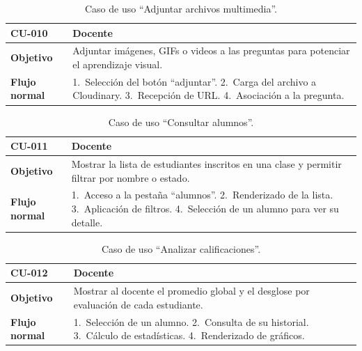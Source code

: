 \begin{table}[H]
\centering
\caption{Caso de uso ``Adjuntar archivos multimedia''.}
\label{tab:cu_multimedia}
\begin{small}
\begin{tabularx}{\textwidth}{|L{3cm}|X|}
\hline
{}
 CU-010 &  Docente\\
\hline
\textbf{Objetivo} & Adjuntar imágenes, GIFs o videos a las preguntas para potenciar el aprendizaje visual.\\
\hline
\textbf{Flujo normal} & 1.~Selección del botón ``adjuntar''. 2.~Carga del archivo a Cloudinary. 3.~Recepción de URL. 4.~Asociación a la pregunta.\\
\hline
\end{tabularx}
\end{small}
\fuenteautor
\end{table}

\begin{table}[H]
\centering
\caption{Caso de uso ``Consultar alumnos''.}
\label{tab:cu_alumnos}
\begin{small}
\begin{tabularx}{\textwidth}{|L{3cm}|X|}
\hline
{}
 CU-011 &  Docente\\
\hline
\textbf{Objetivo} & Mostrar la lista de estudiantes inscritos en una clase y permitir filtrar por nombre o estado.\\
\hline
\textbf{Flujo normal} & 1.~Acceso a la pestaña ``alumnos''. 2.~Renderizado de la lista. 3.~Aplicación de filtros. 4.~Selección de un alumno para ver su detalle.\\
\hline
\end{tabularx}
\end{small}
\fuenteautor
\end{table}

\begin{table}[H]
\centering
\caption{Caso de uso ``Analizar calificaciones''.}
\label{tab:cu_analizar}
\begin{small}
\begin{tabularx}{\textwidth}{|L{3cm}|X|}
\hline
{}
 CU-012 &  Docente\\
\hline
\textbf{Objetivo} & Mostrar al docente el promedio global y el desglose por evaluación de cada estudiante.\\
\hline
\textbf{Flujo normal} & 1.~Selección de un alumno. 2.~Consulta de su historial. 3.~Cálculo de estadísticas. 4.~Renderizado de gráficos.\\
\hline
\end{tabularx}
\end{small}
\fuenteautor
\end{table}


